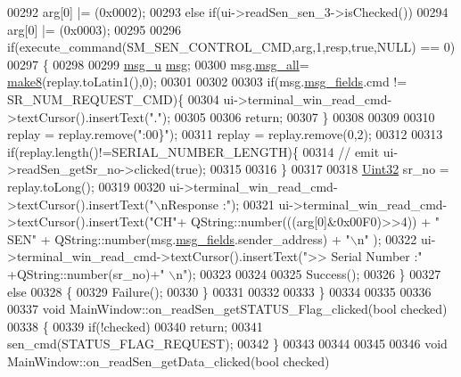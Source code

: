 \begin{DoxyCode}
00292     arg[0] |= (0x0002);
00293     \textcolor{keywordflow}{else} \textcolor{keywordflow}{if}(ui->readSen\_sen\_3->isChecked())
00294     arg[0] |= (0x0003);
00295 
00296      \textcolor{keywordflow}{if}(execute\_command(SM\_SEN\_CONTROL\_CMD,arg,1,resp,\textcolor{keyword}{true},NULL) == 0)
00297      \{
00298 
00299           \hyperlink{a00004_d5/de9/a00176}{msg\_u} \hyperlink{a00017_a6134b74dbfffbaf333e169bd09597b53}{msg};
00300           msg.\hyperlink{a00004_a2763c4336b9376a5385ff279ba0a6591}{msg\_all}= \hyperlink{a00017_aebce94d5e6af7afff661daf74b208de1}{make8}(replay.toLatin1(),0);
00301 
00302 
00303           \textcolor{keywordflow}{if}(msg.\hyperlink{a00004_afe8839ab9699466e2c9efd2327606b8e}{msg\_fields}.cmd != SR\_NUM\_REQUEST\_CMD)\{
00304               ui->terminal\_win\_read\_cmd->textCursor().insertText(\textcolor{stringliteral}{"."});
00305 
00306               \textcolor{keywordflow}{return};
00307           \}
00308 
00309 
00310            replay = replay.remove(\textcolor{stringliteral}{":00\}"});
00311            replay = replay.remove(0,2);
00312 
00313           \textcolor{keywordflow}{if}(replay.length()!=SERIAL\_NUMBER\_LENGTH)\{
00314              \textcolor{comment}{//   emit ui->readSen\_getSr\_no->clicked(true);}
00315 
00316            \}
00317 
00318           \hyperlink{a00004_ab56a7153a5b218eac7698ff141009735}{Uint32} sr\_no = replay.toLong();
00319 
00320           ui->terminal\_win\_read\_cmd->textCursor().insertText(\textcolor{stringliteral}{"\(\backslash\)nResponse :"});
00321           ui->terminal\_win\_read\_cmd->textCursor().insertText(\textcolor{stringliteral}{"CH"}+ QString::number(((arg[0]&0x00F0)>>4)) + \textcolor{stringliteral}{
      " SEN"} + QString::number(msg.\hyperlink{a00004_afe8839ab9699466e2c9efd2327606b8e}{msg\_fields}.sender\_address) + \textcolor{stringliteral}{"\(\backslash\)n"} );
00322           ui->terminal\_win\_read\_cmd->textCursor().insertText(\textcolor{stringliteral}{">> Serial Number :"} +QString::number(sr\_no)+\textcolor{stringliteral}{"
      \(\backslash\)n"});
00323 
00324 
00325         Success();
00326      \}
00327      \textcolor{keywordflow}{else}
00328      \{
00329         Failure();
00330      \}
00331 
00332 
00333 \}
00334 
00335 
00336 
00337 \textcolor{keywordtype}{void} MainWindow::on\_readSen\_getSTATUS\_Flag\_clicked(\textcolor{keywordtype}{bool} checked)
00338 \{
00339     \textcolor{keywordflow}{if}(!checked)
00340         \textcolor{keywordflow}{return};
00341        sen\_cmd(STATUS\_FLAG\_REQUEST);
00342 \}
00343 
00344 
00345 
00346 \textcolor{keywordtype}{void} MainWindow::on\_readSen\_getData\_clicked(\textcolor{keywordtype}{bool} checked)

\end{DoxyCode}
